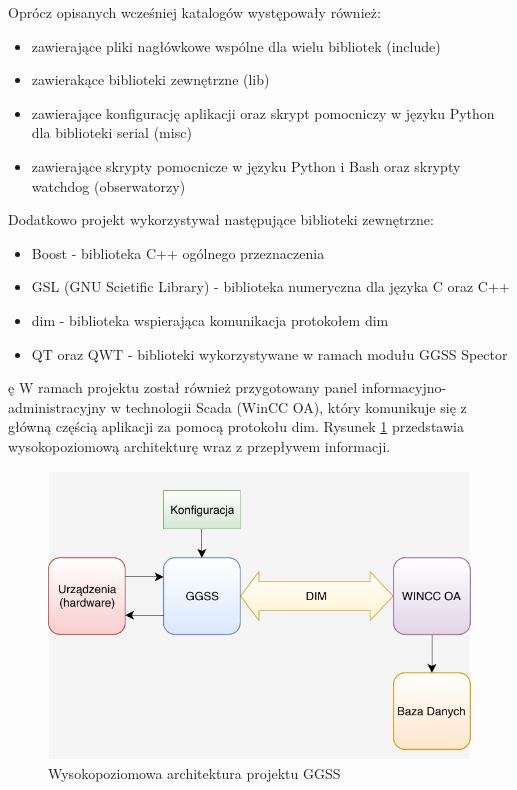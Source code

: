 \par Oprócz opisanych wcześniej katalogów występowały również:
\begin{itemize}
\item zawierające pliki nagłówkowe wspólne dla wielu bibliotek (include)
\item zawierakące biblioteki zewnętrzne (lib)
\item zawierające konfigurację aplikacji oraz skrypt pomocniczy w języku Python dla biblioteki serial (misc)
\item zawierające skrypty pomocnicze w języku Python i Bash oraz skrypty watchdog (obserwatorzy)
\end{itemize}

\par Dodatkowo projekt wykorzystywał następujące biblioteki zewnętrzne:
\begin{itemize}
\item Boost - biblioteka C++ ogólnego przeznaczenia
\item GSL (GNU Scietific Library) - biblioteka numeryczna dla języka C oraz C++
\item dim - biblioteka wspierająca komunikacja protokołem dim
\item QT oraz QWT - biblioteki wykorzystywane w ramach modułu GGSS Spector
\end{itemize}ę
W ramach projektu został również przygotowany panel informacyjno-administracyjny w technologii Scada (WinCC OA), który komunikuje się z główną częścią aplikacji za pomocą protokołu dim. Rysunek \ref{fig:highLevelArch} przedstawia wysokopoziomową architekturę wraz z przepływem informacji.

\begin{figure}[H]
\centering
\caption{Wysokopoziomowa architektura projektu GGSS}
\label{fig:highLevelArch}
\includegraphics[width=\textwidth]{res/highLevelArch}
\end{figure}

